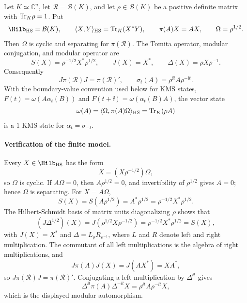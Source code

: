 \begin{example}
\label{ex:finite-tomita-standard-form}
Let \(K\simeq\mathbb C^n\), let
\(\mathcal R=\mathcal B(K)\), and let
\(\rho\in\mathcal B(K)\) be a positive definite matrix with
\({\rm Tr}_K\rho=1\).  Put
\[
  \Hilb_{\rm HS}=\mathcal B(K),
  \qquad
  \langle X,Y\rangle_{\rm HS}={\rm Tr}_K(X^*Y),
  \qquad
  \pi(A)X=AX,
  \qquad
  \Omega=\rho^{1/2}.
\]
Then \(\Omega\) is cyclic and separating for \(\pi(\mathcal R)\).  The
Tomita operator, modular conjugation, and modular operator are
\begin{equation}
  S(X)=\rho^{-1/2}X^*\rho^{1/2},
  \qquad
  J(X)=X^*,
  \qquad
  \Delta(X)=\rho X\rho^{-1}.
  \label{eq:finite-standard-form-tomita-data}
\end{equation}
Consequently
\[
  J\pi(\mathcal R)J=\pi(\mathcal R)',
  \qquad
  \sigma_t(A)=\rho^{\ii t}A\rho^{-\ii t}.
\]
With the boundary-value convention used below for KMS states,
\(F(t)=\omega(A\alpha_t(B))\) and
\(F(t+\ii)=\omega(\alpha_t(B)A)\), the vector state
\[
  \omega(A)=\langle\Omega,\pi(A)\Omega\rangle_{\rm HS}
  ={\rm Tr}_K(\rho A)
\]
is a \(1\)-KMS state for \(\alpha_t=\sigma_{-t}\).
\end{example}

\paragraph{Verification of the finite model.}
Every \(X\in\Hilb_{\rm HS}\) has the form
\[
  X=(X\rho^{-1/2})\Omega,
\]
so \(\Omega\) is cyclic.  If \(A\Omega=0\), then
\(A\rho^{1/2}=0\), and invertibility of \(\rho^{1/2}\) gives \(A=0\);
hence \(\Omega\) is separating.  For \(X=A\Omega\),
\[
  S(X)=S(A\rho^{1/2})=A^*\rho^{1/2}
  =
  \rho^{-1/2}X^*\rho^{1/2}.
\]
The Hilbert-Schmidt basis of matrix units diagonalizing \(\rho\) shows that
\[
  (J\Delta^{1/2})(X)
  =
  J(\rho^{1/2}X\rho^{-1/2})
  =
  \rho^{-1/2}X^*\rho^{1/2}=S(X),
\]
with \(J(X)=X^*\) and \(\Delta=L_\rho R_{\rho^{-1}}\), where \(L\) and
\(R\) denote left and right multiplication.  The commutant of all left
multiplications is the algebra of right multiplications, and
\[
  J\pi(A)J(X)=J(A X^*)=X A^*,
\]
so \(J\pi(\mathcal R)J=\pi(\mathcal R)'\).  Conjugating a left
multiplication by \(\Delta^{\ii t}\) gives
\[
  \Delta^{\ii t}\pi(A)\Delta^{-\ii t}X
  =
  \rho^{\ii t}A\rho^{-\ii t}X,
\]
which is the displayed modular automorphism.


